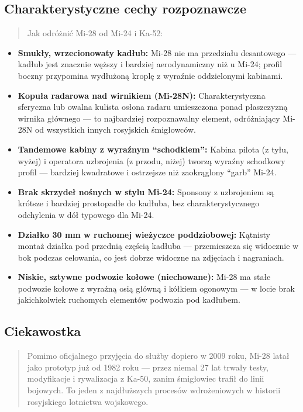 \documentclass[12pt,oneside]{book}
\providecommand{\tightlist}{%
  \setlength{\itemsep}{0pt}\setlength{\parskip}{0pt}}
\begin{document}
\subsection{Charakterystyczne cechy
rozpoznawcze}\label{charakterystyczne-cechy-rozpoznawcze-55}

\begin{quote}
Jak odróżnić Mi-28 od Mi-24 i Ka-52:
\end{quote}

\begin{itemize}
\tightlist
\item
  \textbf{Smukły, wrzecionowaty kadłub:} Mi-28 nie ma przedziału
  desantowego --- kadłub jest znacznie węższy i bardziej aerodynamiczny
  niż u Mi-24; profil boczny przypomina wydłużoną kroplę z wyraźnie
  oddzielonymi kabinami.
\item
  \textbf{Kopuła radarowa nad wirnikiem (Mi-28N):} Charakterystyczna
  sferyczna lub owalna kulista osłona radaru umieszczona ponad
  płaszczyzną wirnika głównego --- to najbardziej rozpoznawalny element,
  odróżniający Mi-28N od wszystkich innych rosyjskich śmigłowców.
\item
  \textbf{Tandemowe kabiny z wyraźnym ``schodkiem'':} Kabina pilota (z
  tyłu, wyżej) i operatora uzbrojenia (z przodu, niżej) tworzą wyraźny
  schodkowy profil --- bardziej kwadratowe i ostrzejsze niż zaokrąglony
  ``garb'' Mi-24.
\item
  \textbf{Brak skrzydeł nośnych w stylu Mi-24:} Sponsony z uzbrojeniem
  są krótsze i bardziej prostopadłe do kadłuba, bez charakterystycznego
  odchylenia w dół typowego dla Mi-24.
\item
  \textbf{Działko 30 mm w ruchomej wieżyczce poddziobowej:} Kątnisty
  montaż działka pod przednią częścią kadłuba --- przemieszcza się
  widocznie w bok podczas celowania, co jest dobrze widoczne na
  zdjęciach i nagraniach.
\item
  \textbf{Niskie, sztywne podwozie kołowe (niechowane):} Mi-28 ma stałe
  podwozie kołowe z wyraźną osią główną i kółkiem ogonowym --- w locie
  brak jakichkolwiek ruchomych elementów podwozia pod kadłubem.
\end{itemize}

\subsection{Ciekawostka}\label{ciekawostka-55}

\begin{quote}
Pomimo oficjalnego przyjęcia do służby dopiero w 2009 roku, Mi-28 latał
jako prototyp już od 1982 roku --- przez niemal 27 lat trwały testy,
modyfikacje i rywalizacja z Ka-50, zanim śmigłowiec trafił do linii
bojowych. To jeden z najdłuższych procesów wdrożeniowych w historii
rosyjskiego lotnictwa wojskowego.
\end{quote}
\end{document}

